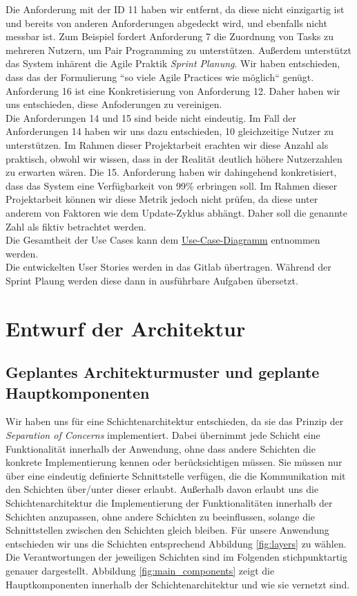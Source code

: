 \documentclass{article}
\newcommand{\gquote}[1][]{\glqq#1\grqq}
\begin{document}
Die Anforderung mit der ID 11 haben wir entfernt, da diese nicht einzigartig ist und bereits von anderen Anforderungen abgedeckt wird, und ebenfalls nicht messbar ist.
Zum Beispiel fordert Anforderung 7 die Zuordnung von Tasks zu mehreren Nutzern, um Pair Programming zu unterstützen.
Außerdem unterstützt das System inhärent die Agile Praktik \textit{Sprint Planung}.
Wir haben entschieden, dass das der Formulierung ``so viele Agile Practices wie möglich`` genügt.\\
Anforderung 16 ist eine Konkretisierung von Anforderung 12.
Daher haben wir uns entschieden, diese Anfoderungen zu vereinigen.\\
Die Anforderungen 14 und 15 sind beide nicht eindeutig.
Im Fall der Anforderungen 14 haben wir uns dazu entschieden, 10 gleichzeitige Nutzer zu unterstützen.
Im Rahmen dieser Projektarbeit erachten wir diese Anzahl als praktisch, obwohl wir wissen, dass in der Realität deutlich höhere Nutzerzahlen zu erwarten wären.
Die 15. Anforderung haben wir dahingehend konkretisiert, dass das System eine Verfügbarkeit von 99\% erbringen soll.
Im Rahmen dieser Projektarbeit können wir diese Metrik jedoch nicht prüfen, da diese unter anderem von Faktoren wie dem Update-Zyklus abhängt.
Daher soll die genannte Zahl als fiktiv betrachtet werden.\\
Die Gesamtheit der Use Cases kann dem \href{https://git.informatik.uni-rostock.de/softwaretechnik-ws-2025-26/uebung3/team3/projekt-team3-uebung3/-/blob/main/anforderungen/Use-Case-Diagram.svg?ref_type=heads}{Use-Case-Diagramm} entnommen werden.\\
Die entwickelten User Stories werden in das Gitlab übertragen.
Während der Sprint Plaung werden diese dann in ausführbare Aufgaben übersetzt.

\section{Entwurf der Architektur}

\subsection{Geplantes Architekturmuster und geplante Hauptkomponenten}

Wir haben uns für eine Schichtenarchitektur entschieden, da sie das Prinzip der \textit{Separation of Concerns} implementiert. Dabei übernimmt jede Schicht eine Funktionalität innerhalb der Anwendung, ohne dass andere Schichten die konkrete Implementierung kennen oder berücksichtigen müssen. Sie müssen nur über eine eindeutig definierte Schnittstelle verfügen, die die Kommunikation mit den Schichten \gquote[über]/\gquote[unter] dieser erlaubt. Außerhalb davon erlaubt uns die Schichtenarchitektur die Implementierung der Funktionalitäten innerhalb der Schichten anzupassen, ohne andere Schichten zu beeinflussen, solange die Schnittstellen zwischen den Schichten gleich bleiben. Für unsere Anwendung entschieden wir uns die Schichten entsprechend Abbildung \ref{fig:layers} zu wählen. Die \gquote[Verantwortungen] der jeweiligen Schichten sind im Folgenden stichpunktartig genauer dargestellt. Abbildung \ref{fig:main_components} zeigt die Hauptkomponenten innerhalb der Schichtenarchitektur und wie sie vernetzt sind.
\end{document}
